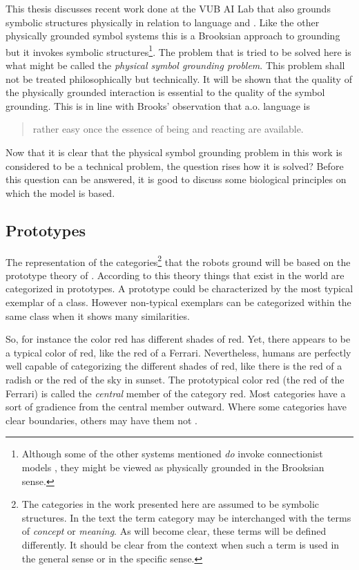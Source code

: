 This thesis discusses recent work done at the VUB AI Lab that also grounds symbolic structures physically in relation to language \cite{steelsvogt:1997} and \cite{belpaeme:1998}. Like the other physically grounded symbol systems this is a Brooksian approach to grounding but it invokes symbolic structures\footnote{Although some of the other systems mentioned {\em do} invoke connectionist models \cite{billard:1997a,taninolfi:1998}, they might be viewed as physically grounded in the Brooksian sense.}. The problem that is tried to be solved here is what might be called the {\em physical symbol grounding problem}. This problem shall not be treated philosophically but technically. It will be shown that the quality of the physically grounded interaction is essential to the quality of the symbol grounding. This is in line with Brooks' observation that a.o. language is 

\begin{quote}
rather easy once the essence of being and reacting are available. \cite{brooks:1990}
\end{quote}

Now that it is clear that the physical symbol grounding problem in this work is considered to be a technical problem, the question rises how it is solved? Before this question can be answered, it is good to discuss some biological principles on which the model is based.

\subsection{Prototypes}

The representation of the categories\footnote{The categories in the work presented here are assumed to be symbolic structures. In the text the term category may be interchanged with the terms of {\em concept} or {\em meaning}. As will become clear, these terms will be defined differently. It should be clear from the context when such a term is used in the general sense or in the specific sense.} that the robots ground will be based on the prototype theory of \cite{rosch:1976}. According to this theory things that exist in the world are categorized in prototypes. A prototype could be characterized by the most typical exemplar of a class. However non-typical exemplars can be categorized within the same class when it shows many similarities.

So, for instance the color red has different shades of red. Yet, there appears to be a typical color of red, like the red of a Ferrari. Nevertheless, humans are perfectly well capable of categorizing the different shades of red, like there is the red of a radish or the red of the sky in sunset. The prototypical color red (the red of the Ferrari) is called the {\em central} member of the category red. Most categories have a sort of gradience from the central member outward. Where some categories have clear boundaries, others may have them not \cite{lakoff:1987}.

